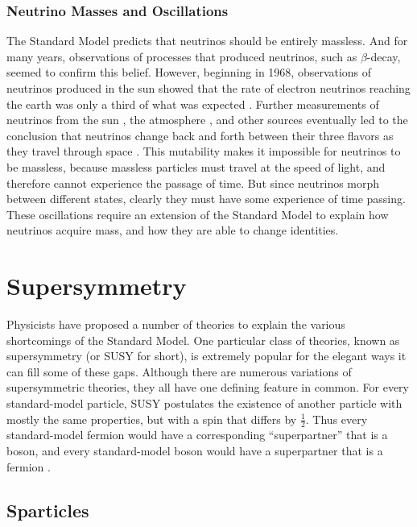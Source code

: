 \subsubsection*{Neutrino Masses and Oscillations}
The Standard Model predicts that neutrinos should be entirely
massless. And for many years, observations of processes that produced
neutrinos, such as $\beta$-decay, seemed to confirm this
belief. However, beginning in 1968, observations of neutrinos produced in
the sun showed that the rate of electron neutrinos reaching the earth
was only a third of what was expected \cite{homestake1968,homestake1992}.
Further measurements of neutrinos from the sun \cite{sno1,sno2}, the
atmosphere \cite{superk}, and other sources eventually led to the conclusion that neutrinos
change back and forth between their three flavors as they
travel through space \cite{nuphenom}. This mutability makes it impossible
for neutrinos to be massless, because massless particles must travel
at the speed of light, and therefore cannot experience the passage of
time. But since neutrinos morph between different states, clearly they
must have some experience of time passing. These
oscillations require an extension of the Standard Model to
explain how neutrinos acquire mass, and how they are able to
change identities.

\section{Supersymmetry}
\label{sec:susy}

Physicists have proposed a number of theories to explain the various
shortcomings of the Standard Model. One particular class of theories,
known as supersymmetry (or SUSY for short), is extremely popular for
the elegant ways it can fill some of these gaps. Although there
are numerous variations of supersymmetric theories, they all have one
defining feature in common. For every standard-model particle, SUSY
postulates the existence of another particle with mostly the same
properties, but with a spin that differs by $\frac{1}{2}$. Thus every standard-model
fermion would have a corresponding ``superpartner'' that is a boson,
and every standard-model boson would have a superpartner that is a
fermion \cite{susyprimer}.


\subsection{Sparticles}
\label{ssec:susy:sparticles}


